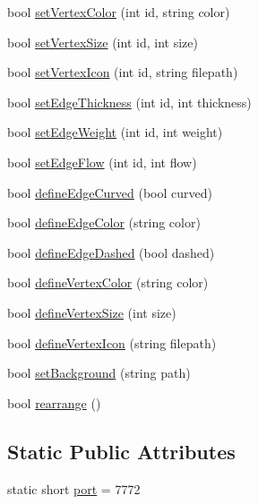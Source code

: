 \begin{DoxyCompactItemize}
\item 
bool \hyperlink{class_graph_viewer_a8b542d7e09e81a45a74760c19233beb0}{set\+Vertex\+Color} (int id, string color)
\item 
bool \hyperlink{class_graph_viewer_ae930dfdfcdeb7a871eefb6028d74b9f9}{set\+Vertex\+Size} (int id, int size)
\item 
bool \hyperlink{class_graph_viewer_a02d5f7393eab9a2d1b66719039597a64}{set\+Vertex\+Icon} (int id, string filepath)
\item 
bool \hyperlink{class_graph_viewer_a07f598272fe3515455eab13be749604a}{set\+Edge\+Thickness} (int id, int thickness)
\item 
bool \hyperlink{class_graph_viewer_ac211de009a0afe2e6d44f4f8d030a2cc}{set\+Edge\+Weight} (int id, int weight)
\item 
bool \hyperlink{class_graph_viewer_a69eb065145063e4dea41961e92e35c8e}{set\+Edge\+Flow} (int id, int flow)
\item 
bool \hyperlink{class_graph_viewer_a08f362be0e682d91e7506dca8caae1b8}{define\+Edge\+Curved} (bool curved)
\item 
bool \hyperlink{class_graph_viewer_a4102580b69826ba83251ef7bb262f8be}{define\+Edge\+Color} (string color)
\item 
bool \hyperlink{class_graph_viewer_af785279b5c204df0e274b20c36276fc3}{define\+Edge\+Dashed} (bool dashed)
\item 
bool \hyperlink{class_graph_viewer_a76de8676b7a93d72af514b84cdaa4d21}{define\+Vertex\+Color} (string color)
\item 
bool \hyperlink{class_graph_viewer_ac4b2a9fec74d38e64088aa79ca4b7d9b}{define\+Vertex\+Size} (int size)
\item 
bool \hyperlink{class_graph_viewer_af1adb6a361457187a820e01dcf0a34b7}{define\+Vertex\+Icon} (string filepath)
\item 
bool \hyperlink{class_graph_viewer_a02437b5fecd8b90de24436068312d593}{set\+Background} (string path)
\item 
bool \hyperlink{class_graph_viewer_a3009a66958686ccb7e78b68e37c3c423}{rearrange} ()
\end{DoxyCompactItemize}
\subsection*{Static Public Attributes}
\begin{DoxyCompactItemize}
\item 
static short \hyperlink{class_graph_viewer_a89d0abe75f41feededc49497cc514342}{port} = 7772
\end{DoxyCompactItemize}


